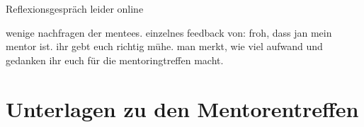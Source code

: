 \documentclass[
    paper=A4,
    div=calc,
    numbers=noendperiod
]{scrartcl}
\begin{document}
    Reflexionsgespräch leider online

    wenige nachfragen der mentees. einzelnes feedback von: froh, dass jan mein mentor ist. ihr gebt euch richtig mühe. man merkt, wie viel aufwand und gedanken ihr euch für die mentoringtreffen macht.

\appendix

\section{Unterlagen zu den Mentorentreffen}
    \label{sec:app}
    
    
    \label{app:meeting3}

    
    \label{app:meeting4}
\end{document}
